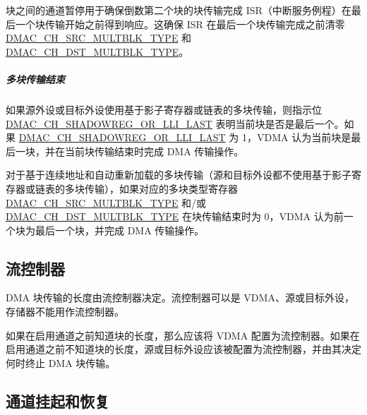 \documentclass[main\_\_CN.tex]{subfiles}
\begin{document}
块之间的通道暂停用于确保倒数第二个块的块传输完成 ISR（中断服务例程）在最后一个块传输开始之前得到响应。这确保 ISR 在最后一个块传输完成之前清零 \hyperref[fielddesc:DMACCHNSRCMULTBLKTYPE]{DMAC\_CH\_SRC\_MULTBLK\_TYPE} 和 \hyperref[fielddesc:DMACCHNDSTMULTBLKTYPE]{DMAC\_CH\_DST\_MULTBLK\_TYPE}。

\subparagraph{多块传输结束}

如果源外设或目标外设使用基于影子寄存器或链表的多块传输，则指示位 \hyperref[fielddesc:DMACCHNSHADOWREGORLLILAST]{DMAC\_CH\_SHADOWREG\_OR\_LLI\_LAST} 表明当前块是否是最后一个。如果 \hyperref[fielddesc:DMACCHNSHADOWREGORLLILAST]{DMAC\_CH\_SHADOWREG\_OR\_LLI\_LAST} 为 1，VDMA 认为当前块是最后一块，并在当前块传输结束时完成 DMA 传输操作。

对于基于连续地址和自动重新加载的多块传输（源和目标外设都不使用基于影子寄存器或链表的多块传输），如果对应的多块类型寄存器 \hyperref[fielddesc:DMACCHNSRCMULTBLKTYPE]{DMAC\_CH\_SRC\_MULTBLK\_TYPE} 和/或 \hyperref[fielddesc:DMACCHNDSTMULTBLKTYPE]{DMAC\_CH\_DST\_MULTBLK\_TYPE} 在块传输结束时为 0，VDMA 认为前一个块为最后一个块，并完成 DMA 传输操作。

\subsection{流控制器}

DMA 块传输的长度由流控制器决定。流控制器可以是 VDMA、源或目标外设，存储器不能用作流控制器。

如果在启用通道之前知道块的长度，那么应该将 VDMA 配置为流控制器。如果在启用通道之前不知道块的长度，源或目标外设应该被配置为流控制器，并由其决定何时终止 DMA 块传输。

\subsection{通道挂起和恢复}
\end{document}

